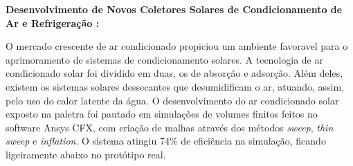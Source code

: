 
\textbf{Desenvolvimento de Novos Coletores Solares de Condicionamento de Ar e
Refrigeração :}

O mercado crescente de ar condicionado propiciou um ambiente favoravel para o
aprimoramento de sistemas de condicionamento solares. A tecnologia de ar
condicionado solar foi dividido em duas, os de absorção e adsorção. Além deles,
existem os sistemas solares dessecantes que desumidificam o ar, atuando, assim,
 pelo uso do calor latente da água.
 O desenvolvimento do ar condicionado solar exposto na paletra foi pautado em
 simulações de volumes finitos feitos no software Ansys CFX, com criação de
 malhas através dos métodos \textit{sweep}, \textit{thin sweep} e
 \textit{inflation}. O sistema atingiu 74\% de eficiência na simulação, ficando
 ligeiramente abaixo no protótipo real.
